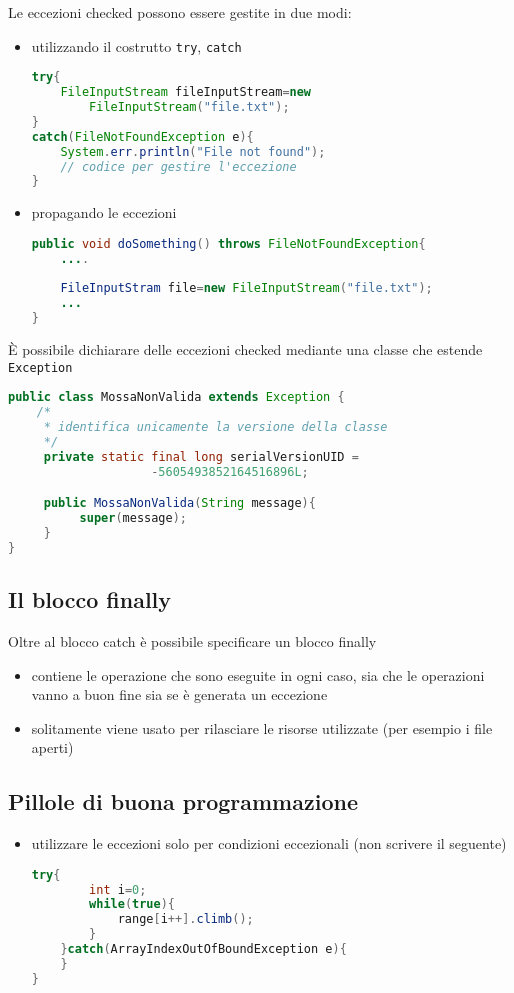 \documentclass{article}
\begin{document}
Le eccezioni checked possono essere gestite in due modi:
\begin{itemize}
\item utilizzando il costrutto \texttt{try}, \texttt{catch}
\begin{lstlisting}[language=Java]
try{
    FileInputStream fileInputStream=new 
        FileInputStream("file.txt");        
}
catch(FileNotFoundException e){
    System.err.println("File not found");
    // codice per gestire l'eccezione
}
\end{lstlisting}
\item propagando le eccezioni
\begin{lstlisting}[language=Java]
public void doSomething() throws FileNotFoundException{
    ....
    
    FileInputStram file=new FileInputStream("file.txt");
    ...
}
\end{lstlisting}
\end{itemize}

\`E possibile dichiarare delle eccezioni checked mediante una classe che estende \texttt{Exception}

\begin{lstlisting}[language=Java]
public class MossaNonValida extends Exception {
    /*
     * identifica unicamente la versione della classe 
     */
     private static final long serialVersionUID = 
	                -5605493852164516896L;

     public MossaNonValida(String message){
          super(message);
     }
}
\end{lstlisting}


\subsection{Il blocco finally}
Oltre al blocco catch \`e possibile specificare un blocco finally
\begin{itemize}
\item contiene le operazione che sono eseguite in ogni caso, sia che le operazioni vanno a buon fine sia se \`e generata un eccezione
\item solitamente viene usato per rilasciare le risorse utilizzate (per esempio i file aperti)
 \end{itemize}

\subsection{Pillole di buona programmazione}
\begin{itemize}
\item utilizzare le eccezioni solo per condizioni eccezionali (non scrivere il seguente)
\begin{lstlisting}[language=Java]
try{
        int i=0;
        while(true){
            range[i++].climb();
        }
    }catch(ArrayIndexOutOfBoundException e){
    }
}
\end{lstlisting}
\end{itemize}
\end{document}
